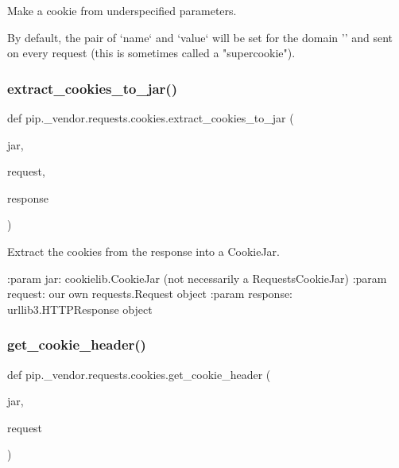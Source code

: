 \begin{DoxyVerb}Make a cookie from underspecified parameters.

By default, the pair of `name` and `value` will be set for the domain ''
and sent on every request (this is sometimes called a "supercookie").
\end{DoxyVerb}
 \mbox{\label{namespacepip_1_1__vendor_1_1requests_1_1cookies_abc928d5e92aa070fc82f0f2fe72b9623}} 
\subsubsection{\texorpdfstring{extract\+\_\+cookies\+\_\+to\+\_\+jar()}{extract\_cookies\_to\_jar()}}
{\footnotesize\ttfamily def pip.\+\_\+vendor.\+requests.\+cookies.\+extract\+\_\+cookies\+\_\+to\+\_\+jar (\begin{DoxyParamCaption}\item[{}]{jar,  }\item[{}]{request,  }\item[{}]{response }\end{DoxyParamCaption})}

\begin{DoxyVerb}Extract the cookies from the response into a CookieJar.

:param jar: cookielib.CookieJar (not necessarily a RequestsCookieJar)
:param request: our own requests.Request object
:param response: urllib3.HTTPResponse object
\end{DoxyVerb}
 \mbox{\label{namespacepip_1_1__vendor_1_1requests_1_1cookies_a27286c78be1686546e6305b4928cdcc1}} 
\subsubsection{\texorpdfstring{get\+\_\+cookie\+\_\+header()}{get\_cookie\_header()}}
{\footnotesize\ttfamily def pip.\+\_\+vendor.\+requests.\+cookies.\+get\+\_\+cookie\+\_\+header (\begin{DoxyParamCaption}\item[{}]{jar,  }\item[{}]{request }\end{DoxyParamCaption})}


